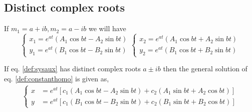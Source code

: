 \documentclass[oneside,11pt,pdftex,final]{book}%
\numberwithin{equation}{section}
\numberwithin{section}{chapter}
\numberwithin{equation}{chapter}
\begin{document}
%	
%
%

\subsection{Distinct complex roots}
If $ m_1=a+ib,m_2=a-ib $ we will have \[ \begin{cases}
	x_1=e^{at}(A_1\cos bt -A_2 \sin bt)\\
	y_1=e^{at}(B_1\cos bt -B_2 \sin bt)
\end{cases} \begin{cases}
x_2=e^{at}(A_1\cos bt +A_2 \sin bt)\\
y_2=e^{at}(B_1\cos bt +B_2 \sin bt)
\end{cases} \]


If eq. \ref{def:sysaux} has distinct complex roots $a\pm ib $ then the general solution of eq. \ref{def:constanthomo} is given as,
\begin{align*}
	\begin{cases}
		x&=e^{at}[c_1(A_1 \cos bt - A_2 \sin bt)+c_2(A_1 \sin bt + A_2 \cos bt)]\\
		y&=e^{at}[c_1(B_1 \cos bt- B_2 \sin bt)+c_2(B_1 \sin bt + B_2 \cos bt)]
	\end{cases}
\end{align*}
\end{document}
